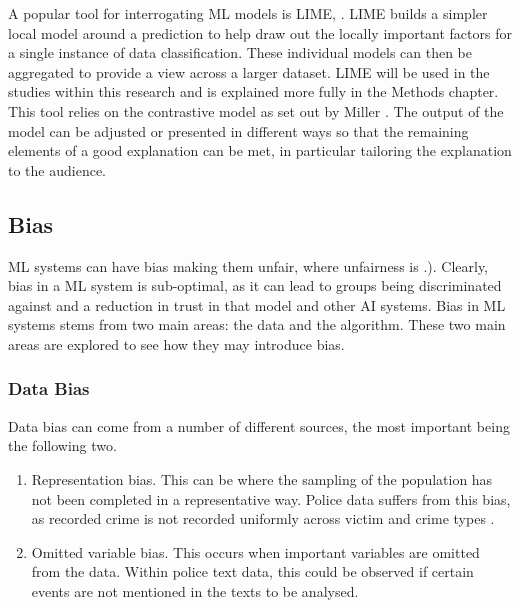 A popular tool  for interrogating ML models is LIME, \parencite{ribeiro2016should}. LIME  builds a simpler local model around a prediction to help draw out the locally important factors for a single instance of data classification. These individual models can then be aggregated to provide a view across a larger dataset.  LIME will be used in the studies within this research and is explained more fully in the Methods chapter. This tool relies on the contrastive model as set out by Miller \parencite{miller2019explanation}. The output of the model can be adjusted or presented in different ways so that the remaining elements of a good explanation can be met, in particular tailoring the explanation to the audience.

\subsection{Bias} ML systems can have bias making them unfair, where unfairness is  \parencite{mehrabi2021survey}.). Clearly, bias in a ML system is sub-optimal, as it can lead to groups being discriminated against and a reduction in trust in that model and other AI systems. Bias in ML systems stems from two main areas: the data and the algorithm. These two main areas are explored to see how they may introduce bias.

\subsubsection{Data Bias} Data bias can come from a number of different sources, the most important being the following two. 

\begin{enumerate}
\item{Representation bias}. This can be where the sampling of the population has not been completed in a representative way. Police data suffers from this bias, as recorded crime is not recorded uniformly across victim and crime types  \parencite{baumer2002neighborhood, tarling2010reporting }.

\item{Omitted variable bias}. This occurs when important variables are omitted from the data. Within police text data, this could be observed if certain events are not mentioned in the texts to be analysed. 
\end{enumerate} 

